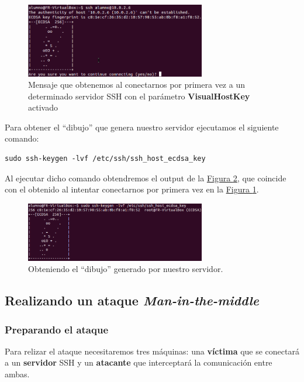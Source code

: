\documentclass[10pt,a4paper,spanish]{article}
\begin{document}
\begin{figure}[!h]
    \centering
    \includegraphics[width=0.7\textwidth]{visualhostkey}
    \caption{Mensaje que obtenemos al conectarnos por primera vez a un determinado servidor SSH con el parámetro \textbf{VisualHostKey} activado}
    \label{visualhostkey}
\end{figure}

Para obtener el ``dibujo'' que genera nuestro servidor ejecutamos el siguiente comando:
\begin{verbatim}
sudo ssh-keygen -lvf /etc/ssh/ssh_host_ecdsa_key
\end{verbatim}

Al ejecutar dicho comando obtendremos el output de la \hyperref[visualhostkey1]{Figura \ref*{visualhostkey1}}, que coincide con el obtenido al intentar conectarnos por primera vez en la \hyperref[visualhostkey]{Figura \ref*{visualhostkey}}.

\begin{figure}[!h]
    \centering
    \includegraphics[width=0.7\textwidth]{comprobacion_visualkey}
    \caption{Obteniendo el ``dibujo'' generado por nuestro servidor.}
    \label{visualhostkey1}
\end{figure}

\subsection{Realizando un ataque \textit{Man-in-the-middle}}
\subsubsection{Preparando el ataque}
Para relizar el ataque necesitaremos tres máquinas: una \textbf{víctima} que se conectará a un \textbf{servidor} SSH y un \textbf{atacante} que interceptará la comunicación entre ambas.
\end{document}
